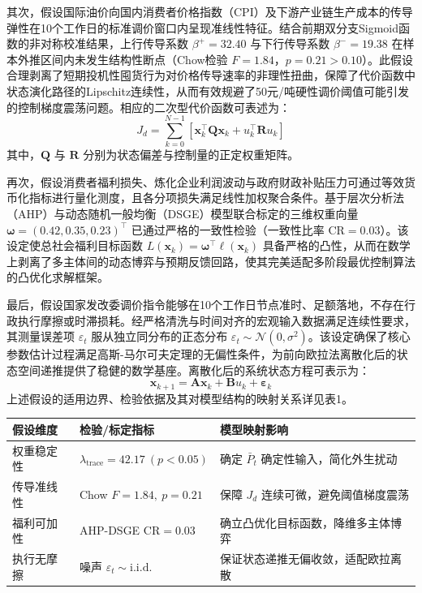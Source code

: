 \documentclass{mcmthesis}
\begin{document}
其次，假设国际油价向国内消费者价格指数（CPI）及下游产业链生产成本的传导弹性在10个工作日的标准调价窗口内呈现准线性特征。结合前期双分支Sigmoid函数的非对称校准结果，上行传导系数 $\beta^+ = 32.40$ 与下行传导系数 $\beta^- = 19.38$ 在样本外推区间内未发生结构性断点（Chow检验 $F=1.84$，$p=0.21>0.10$）。此假设合理剥离了短期投机性囤货行为对价格传导速率的非理性扭曲，保障了代价函数中状态演化路径的Lipschitz连续性，从而有效规避了50元/吨硬性调价阈值可能引发的控制梯度震荡问题。相应的二次型代价函数可表述为：
$$ J_d = \sum_{k=0}^{N-1} \left[ \boldsymbol{x}_k^\top \boldsymbol{Q} \boldsymbol{x}_k + u_k^\top \boldsymbol{R} u_k \right] \tag{2} $$
其中，$\boldsymbol{Q}$ 与 $\boldsymbol{R}$ 分别为状态偏差与控制量的正定权重矩阵。

再次，假设消费者福利损失、炼化企业利润波动与政府财政补贴压力可通过等效货币化指标进行量化测度，且各分项损失满足线性加权聚合条件。基于层次分析法（AHP）与动态随机一般均衡（DSGE）模型联合标定的三维权重向量 $\boldsymbol{\omega}=(0.42, 0.35, 0.23)^\top$ 已通过严格的一致性检验（一致性比率 $\text{CR}=0.03$）。该设定使总社会福利目标函数 $L(\boldsymbol{x}_k)=\boldsymbol{\omega}^\top \boldsymbol{\ell}(\boldsymbol{x}_k)$ 具备严格的凸性，从而在数学上剥离了多主体间的动态博弈与预期反馈回路，使其完美适配多阶段最优控制算法的凸优化求解框架。

最后，假设国家发改委调价指令能够在10个工作日节点准时、足额落地，不存在行政执行摩擦或时滞损耗。经严格清洗与时间对齐的宏观输入数据满足连续性要求，其测量误差项 $\varepsilon_t$ 服从独立同分布的正态分布 $\varepsilon_t \sim \mathcal{N}(0, \sigma^2)$。该设定确保了核心参数估计过程满足高斯-马尔可夫定理的无偏性条件，为前向欧拉法离散化后的状态空间递推提供了稳健的数学基座。离散化后的系统状态方程可表示为：
$$ \boldsymbol{x}_{k+1} = \boldsymbol{A} \boldsymbol{x}_k + \boldsymbol{B} u_k + \boldsymbol{\varepsilon}_k \tag{3} $$
上述假设的适用边界、检验依据及其对模型结构的映射关系详见表1。

\begin{table}[htbp]
\centering
\begin{tabular}{l l l}
\toprule
假设维度 & 检验/标定指标 & 模型映射影响 \\
\midrule
权重稳定性 & $\lambda_{\text{trace}}=42.17\ (p<0.05)$ & 确定 $\bar{P}_t$ 确定性输入，简化外生扰动 \\
传导准线性 & Chow $F=1.84,\ p=0.21$ & 保障 $J_d$ 连续可微，避免阈值梯度震荡 \\
福利可加性 & AHP-DSGE $\text{CR}=0.03$ & 确立凸优化目标函数，降维多主体博弈 \\
执行无摩擦 & 噪声 $\varepsilon_t \sim \text{i.i.d.}$ & 保证状态递推无偏收敛，适配欧拉离散 \\
\bottomrule
\end{tabular}
\end{table}
\end{document}
